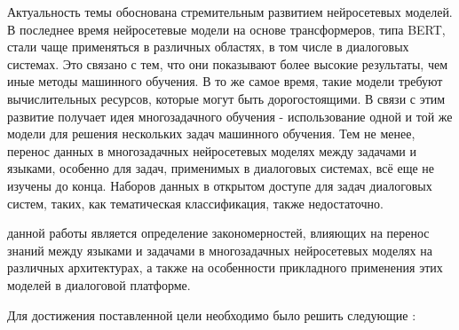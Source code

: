 {\actuality} 
Актуальность темы обоснована стремительным развитием нейросетевых моделей. В последнее время нейросетевые модели на основе трансформеров, типа BERT, стали чаще применяться в различных областях, в том числе в диалоговых системах. Это связано с тем, что они показывают более высокие результаты, чем иные методы машинного обучения. В то же самое время, такие модели требуют вычислительных ресурсов, которые могут быть дорогостоящими. В связи с этим развитие получает идея многозадачного обучения - использование одной и той же модели для решения нескольких задач машинного обучения. Тем не менее, перенос данных в многозадачных нейросетевых моделях между задачами и языками, особенно для задач, применимых в диалоговых системах, всё еще не изучены до конца. Наборов данных в открытом доступе для задач диалоговых систем, таких, как тематическая классификация, также недостаточно.


{\aim} данной работы является определение закономерностей, влияющих на перенос знаний между языками и задачами в многозадачных нейросетевых моделях на различных архитектурах, а также на особенности прикладного применения этих моделей в диалоговой платформе.

Для достижения поставленной цели необходимо было решить следующие {\tasks}:

